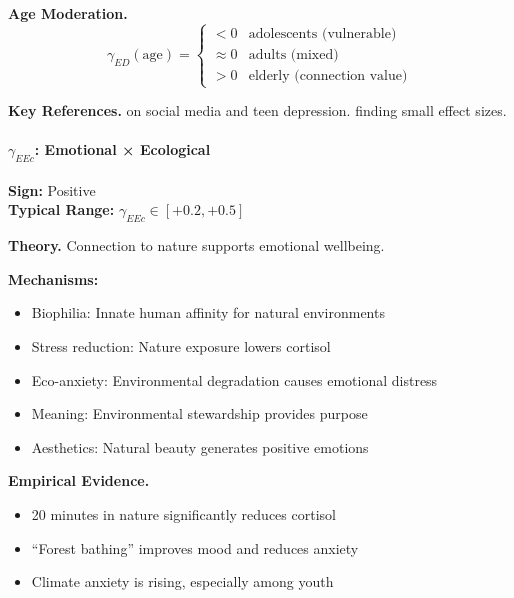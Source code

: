 \textbf{Age Moderation.}
\begin{equation}
\gamma_{ED}(\text{age}) = \begin{cases}
    < 0 & \text{adolescents (vulnerable)} \\
    \approx 0 & \text{adults (mixed)} \\
    > 0 & \text{elderly (connection value)}
\end{cases}
\end{equation}

\textbf{Key References.}
\citet{twenge2018increases} on social media and teen depression.
\citet{orben2019association} finding small effect sizes.


\paragraph{$\gamma_{EEc}$: Emotional × Ecological}

\begin{tcolorbox}[colback=green!5, colframe=green!50!black]
\textbf{Sign:} Positive \\
\textbf{Typical Range:} $\gamma_{EEc} \in [+0.2, +0.5]$
\end{tcolorbox}

\textbf{Theory.}
Connection to nature supports emotional wellbeing.

\textbf{Mechanisms:}
\begin{itemize}
    \item Biophilia: Innate human affinity for natural environments
    \item Stress reduction: Nature exposure lowers cortisol
    \item Eco-anxiety: Environmental degradation causes emotional distress
    \item Meaning: Environmental stewardship provides purpose
    \item Aesthetics: Natural beauty generates positive emotions
\end{itemize}

\textbf{Empirical Evidence.}
\begin{itemize}
    \item 20 minutes in nature significantly reduces cortisol \citep{hunter2019urban}
    \item ``Forest bathing'' improves mood and reduces anxiety \citep{li2010effect}
    \item Climate anxiety is rising, especially among youth \citep{hickman2021climate}
\end{itemize}

